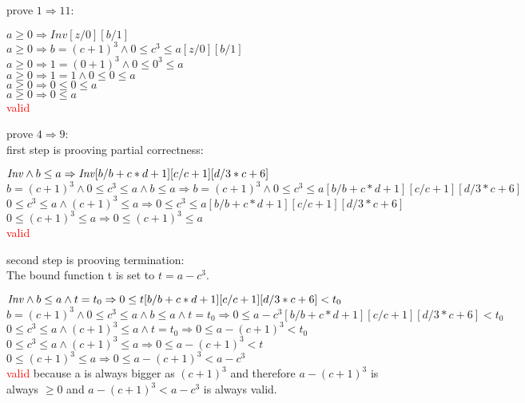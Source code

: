 \documentclass[a4paper]{scrartcl}
\begin{document}
prove $1 \Rightarrow 11$:\\
\begin{center}
$a \geq 0 \Rightarrow Inv[z/0][b/1]$\\
$a \geq 0 \Rightarrow b=(c+1)^3\land 0\leq c^3\leq a[z/0][b/1] $\\
$a \geq 0 \Rightarrow 1=(0+1)^3\land 0\leq 0^3\leq a$\\
$a \geq 0 \Rightarrow 1=1 \land 0\leq 0 \leq a$\\
$a \geq 0 \Rightarrow 0 \leq 0 \leq a$\\
$a \geq 0 \Rightarrow 0 \leq a$\\
\textcolor{red}{valid}\\
\end{center} 

prove $4 \Rightarrow 9$:\\
first step is prooving partial correctness:\\
\begin{center}
$\mathit{Inv} \wedge b\leq a \Rightarrow \mathit{Inv}[b/b+c*d+1][c/c+1][d/3*c+6]$\\
$b=(c+1)^3\land 0\leq c^3\leq a \wedge b\leq a \Rightarrow b=(c+1)^3\land 0\leq c^3\leq a[b/b+c*d+1][c/c+1][d/3*c+6]$\\
$0\leq c^3\leq a \wedge (c+1)^3\leq a \Rightarrow 0\leq c^3\leq a[b/b+c*d+1][c/c+1][d/3*c+6]$\\
$0\leq (c+1)^3\leq a \Rightarrow 0\leq (c+1)^3\leq a$\\
\textcolor{red}{valid}\\
\end{center} 
second step is prooving termination:\\
The bound function t is set to $t = a - c^3$.\\
\begin{center}
$\mathit{Inv} \wedge b\leq a \wedge t = t_0 \Rightarrow 0 \leq t[b/b+c*d+1][c/c+1][d/3*c+6] < t_0$\\
$b=(c+1)^3\land 0\leq c^3\leq a \wedge b\leq a \wedge t = t_0 \Rightarrow 0 \leq a - c^3[b/b+c*d+1][c/c+1][d/3*c+6] < t_0$\\
$0\leq c^3\leq a \wedge (c+1)^3 \leq a \wedge t = t_0 \Rightarrow 0 \leq a - (c+1)^3 < t_0$\\
$0\leq c^3\leq a \wedge (c+1)^3 \leq a \Rightarrow 0 \leq a - (c+1)^3 < t$\\
$0\leq (c+1)^3 \leq a \Rightarrow 0 \leq a - (c+1)^3 < a - c^3$\\
\textcolor{red}{valid} because a is always bigger as $(c+1)^3$ and therefore $a - (c+1)^3$ is always $\geq 0$ and $a - (c+1)^3 < a - c^3$ is always valid.\\
\end{center} 
\end{document}
